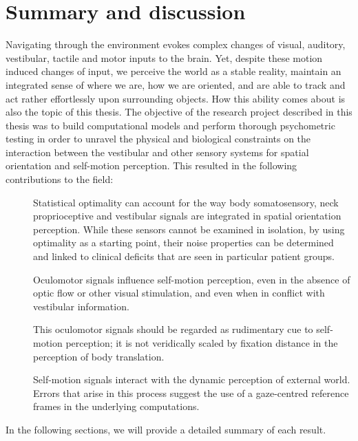 \chapter{Summary and discussion}

Navigating through the environment evokes complex changes of visual, auditory, vestibular, tactile and
motor inputs to the brain. Yet, despite these motion induced changes of input, we perceive the world as a stable reality, maintain an integrated sense of where we are, how we are oriented, and are able to track and act rather effortlessly upon surrounding objects. How this ability comes about is also the topic of this thesis. The objective of the research project described in this thesis was to build computational models and perform thorough psychometric testing in order to unravel the physical and biological constraints on the interaction between the vestibular and other sensory systems for spatial orientation and self-motion perception. This resulted in the following contributions to the field:

\begin{description}
\item[] Statistical optimality can account for the way body somatosensory, neck proprioceptive and vestibular signals are integrated in spatial orientation perception. While these sensors cannot be examined in isolation, by using optimality as a starting point, their noise properties can be determined and linked to clinical deficits that are seen in particular patient groups.
\item[] Oculomotor signals influence self-motion perception, even in the absence of optic flow or other visual stimulation, and even when in conflict with vestibular information. 
\item[] This oculomotor signals should be regarded as rudimentary cue to self-motion perception; it is not veridically scaled by fixation distance in the perception of body translation. 
\item[] Self-motion signals interact with the dynamic perception of external world.  Errors that arise in this process suggest the use of a gaze-centred reference frames in the underlying computations. 
\end{description}

In the following sections, we will provide a detailed summary of each result. 

